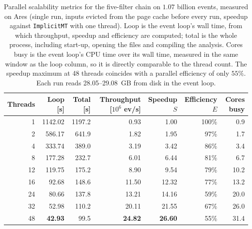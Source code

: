\begin{table}[htbp]
\centering
\caption{Parallel scalability metrics for the five-filter chain on $1.07$ billion events, measured on Ares (single run, inputs evicted from the page cache before every run, speedup against \texttt{ImplicitMT} with one thread). Loop is the event loop's wall time, from which throughput, speedup and efficiency are computed; total is the whole process, including start-up, opening the files and compiling the analysis. Cores busy is the event loop's CPU time over its wall time, measured in the same window as the loop column, so it is directly comparable to the thread count. The speedup maximum at 48 threads coincides with a parallel efficiency of only $55\%$. Each run reads 28.05--29.08~GB from disk in the event loop.}
\label{tab:scalability-chain}
\setlength{\tabcolsep}{5pt}
\begin{tabular}{rrrrrrr}
\toprule
Threads & Loop [s] & Total [s] & Throughput [$10^6$ ev/s] & Speedup $S$ & Efficiency $E$ & Cores busy \\
\midrule
 1 & 1142.02 & 1197.2 & 0.93 & 1.00 & 100\% & 0.9 \\
 2 & 586.17 & 641.9 & 1.82 & 1.95 & 97\% & 1.7 \\
 4 & 333.74 & 389.0 & 3.19 & 3.42 & 86\% & 3.4 \\
 8 & 177.28 & 232.7 & 6.01 & 6.44 & 81\% & 6.7 \\
12 & 119.75 & 175.2 & 8.90 & 9.54 & 79\% & 10.2 \\
16 & 92.68 & 148.6 & 11.50 & 12.32 & 77\% & 13.2 \\
24 & 80.66 & 137.8 & 13.21 & 14.16 & 59\% & 20.0 \\
32 & 52.98 & 110.2 & 20.11 & 21.55 & 67\% & 26.0 \\
48 & \textbf{42.93} & 99.5 & \textbf{24.82} & \textbf{26.60} & 55\% & 31.4 \\
\bottomrule
\end{tabular}
\end{table}
